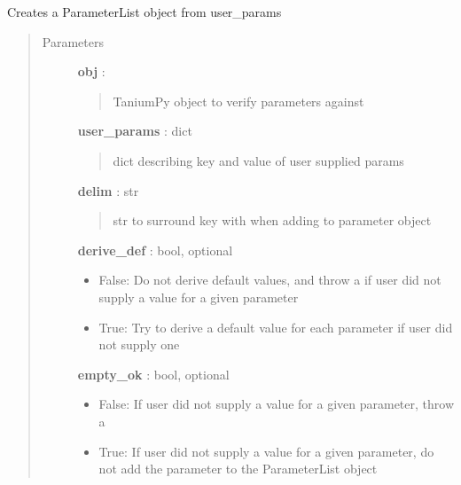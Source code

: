 \documentclass[letterpaper,10pt,english]{sphinxmanual}
\begin{document}
\begin{fulllineitems}
\label{pytan.utils:pytan.utils.build_param_objlist}
Creates a ParameterList object from user\_params
\begin{quote}\begin{description}
\item[{Parameters}] \leavevmode
\textbf{obj} : {\hyperref[taniumpy.object_types:taniumpy.object_types.base.BaseType]{}}
\begin{quote}

TaniumPy object to verify parameters against
\end{quote}

\textbf{user\_params} : dict
\begin{quote}

dict describing key and value of user supplied params
\end{quote}

\textbf{delim} : str
\begin{quote}

str to surround key with when adding to parameter object
\end{quote}

\textbf{derive\_def} : bool, optional
\begin{itemize}
\item {} 
False: Do not derive default values, and throw a {\hyperref[pytan.utils:pytan.utils.HandlerError]{}} if user did not supply a value for a given parameter

\item {} 
True: Try to derive a default value for each parameter if user did not supply one

\end{itemize}

\textbf{empty\_ok} : bool, optional
\begin{itemize}
\item {} 
False: If user did not supply a value for a given parameter, throw a {\hyperref[pytan.utils:pytan.utils.HandlerError]{}}

\item {} 
True: If user did not supply a value for a given parameter, do not add the parameter to the ParameterList object

\end{itemize}


\end{description}
\end{quote}
\end{fulllineitems}
\end{document}
